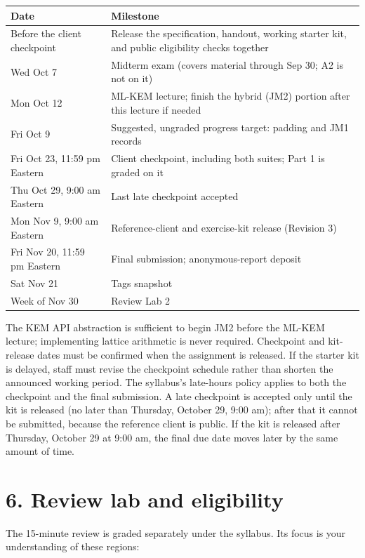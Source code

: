 \documentclass[11pt]{article}
\begin{document}
\begin{center}\small
\begin{tabular}{p{1.67in}p{3.58in}}
\toprule
\textbf{Date} & \textbf{Milestone} \\
\midrule
Before the client checkpoint & Release the specification, handout, working starter kit, and public eligibility checks together \\
Wed Oct 7 & Midterm exam (covers material through Sep 30; A2 is not on it) \\
Mon Oct 12 & ML-KEM lecture; finish the hybrid (JM2) portion after this lecture if needed \\
Fri Oct 9 & Suggested, ungraded progress target: padding and JM1 records \\
Fri Oct 23, 11:59 pm Eastern & Client checkpoint, including both suites; Part 1 is graded on it \\
Thu Oct 29, 9:00 am Eastern & Last late checkpoint accepted \\
Mon Nov 9, 9:00 am Eastern & Reference-client and exercise-kit release (Revision 3) \\
Fri Nov 20, 11:59 pm Eastern & Final submission; anonymous-report deposit \\
Sat Nov 21 & Tags snapshot \\
Week of Nov 30 & Review Lab 2 \\
\bottomrule
\end{tabular}
\end{center}

The KEM API abstraction is sufficient to begin JM2 before the ML-KEM lecture; implementing lattice arithmetic is never required. Checkpoint and kit-release dates must be confirmed when the assignment is released. If the starter kit is delayed, staff must revise the checkpoint schedule rather than shorten the announced working period. The syllabus's late-hours policy applies to both the checkpoint and the final submission. A late checkpoint is accepted only until the kit is released (no later than Thursday, October 29, 9:00 am); after that it cannot be submitted, because the reference client is public. If the kit is released after Thursday, October 29 at 9:00 am, the final due date moves later by the same amount of time.

\section*{6. Review lab and eligibility}

The 15-minute review is graded separately under the syllabus. Its focus is your understanding of these regions:
\end{document}
